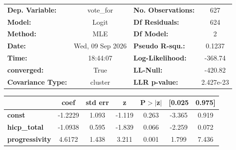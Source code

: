 \begin{center}
\begin{tabular}{lclc}
\toprule
\textbf{Dep. Variable:}   &    vote\_for     & \textbf{  No. Observations:  } &      627    \\
\textbf{Model:}           &      Logit       & \textbf{  Df Residuals:      } &      624    \\
\textbf{Method:}          &       MLE        & \textbf{  Df Model:          } &        2    \\
\textbf{Date:}            & Wed, 09 Sep 2026 & \textbf{  Pseudo R-squ.:     } &   0.1237    \\
\textbf{Time:}            &     18:44:07     & \textbf{  Log-Likelihood:    } &   -368.74   \\
\textbf{converged:}       &       True       & \textbf{  LL-Null:           } &   -420.82   \\
\textbf{Covariance Type:} &     cluster      & \textbf{  LLR p-value:       } & 2.427e-23   \\
\bottomrule
\end{tabular}
\begin{tabular}{lcccccc}
                       & \textbf{coef} & \textbf{std err} & \textbf{z} & \textbf{P$> |$z$|$} & \textbf{[0.025} & \textbf{0.975]}  \\
\midrule
\textbf{const}         &      -1.2229  &        1.093     &    -1.119  &         0.263        &       -3.365    &        0.919     \\
\textbf{hicp\_total}   &      -1.0938  &        0.595     &    -1.839  &         0.066        &       -2.259    &        0.072     \\
\textbf{progressivity} &       4.6172  &        1.438     &     3.211  &         0.001        &        1.799    &        7.436     \\
\bottomrule
\end{tabular}
\end{center}